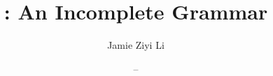 \documentclass[11pt, a4paper, sidefootnotes, english]{pancake-book}
\begin{document}
\title{\langname: An Incomplete Grammar}
\author{Jamie Ziyi Li}
\date{ -- \DTMtoday}

\frontmatter
\maketitle
\tableofcontents
\listoftables
\listoffigures

\mainmatter





\backmatter
\printglossary
\printbibliography
\end{document}
